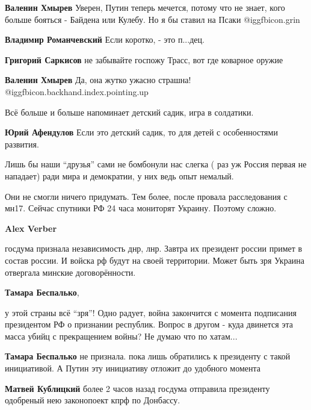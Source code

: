 \begin{itemize}
\begin{itemize}
\textbf{Валенин Хмырев} Уверен, Путин теперь мечется, потому что не знает, кого больше бояться - Байдена или Кулебу. Но я бы ставил на Псаки @igg{fbicon.grin} 

\textbf{Владимир Романчевский} Если коротко, - это п...дец.

\textbf{Григорий Саркисов} не забывайте госпожу Трасс, вот где коварное оружие

\textbf{Валенин Хмырев} Да, она жутко ужасно страшна! @igg{fbicon.backhand.index.pointing.up} 
\end{itemize} %

Всё больше и больше напоминает детский садик, игра в солдатики.

\textbf{Юрий Афендулов} Если это детский садик, то для детей с особенностями развития.


Лишь бы наши \enquote{друзья} сами не бомбонули нас слегка ( раз уж Россия первая не
нападает) ради мира и демократии, у них ведь опыт немалый.

\begin{itemize} %

Они не смогли ничего придумать. Тем более, после провала расследования с мн17.
Сейчас спутники РФ 24 часа мониторят Украину. Поэтому сложно.

\textbf{Alex Verber} 

госдума признала независимость днр, лнр. Завтра их президент россии примет в
состав россии. И войска рф будут на своей территории. Может быть зря Украина
отвергала минские договорённости.

\textbf{Тамара Беспалько},

у этой страны всё \enquote{зря}! Одно радует, война закончится с момента подписания
президентом РФ о признании республик. Вопрос в другом - куда двинется эта масса
убийц с прекращением войны? Не думаю что по хатам...

\textbf{Тамара Беспалько} не признала. пока лишь обратились к президенту с такой инициативой. А Путин эту инициативу отложит до удобного момента

\textbf{Матвей Кублицкий} более 2 часов назад госдума отправила президенту одобреный нею законопоект кпрф по Донбассу.


\end{itemize}
\end{itemize}
